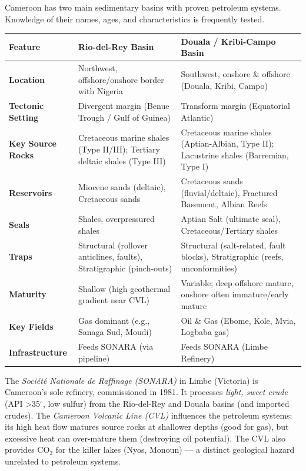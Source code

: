 \documentclass[11pt]{article}
\begin{document}
Cameroon has two main sedimentary basins with proven petroleum systems. Knowledge of their names, ages, and characteristics is frequently tested.

\begin{center}
\begin{tabularx}{\linewidth}{|l|X|X|}\hline
\rowcolor{popblueL}
\textbf{Feature} & \textbf{Rio-del-Rey Basin} & \textbf{Douala / Kribi-Campo Basin} \\ \hline
\textbf{Location} & Northwest, offshore/onshore border with Nigeria & Southwest, onshore \& offshore (Douala, Kribi, Campo) \\ \hline
\textbf{Tectonic Setting} & Divergent margin (Benue Trough / Gulf of Guinea) & Transform margin (Equatorial Atlantic) \\ \hline
\textbf{Key Source Rocks} & Cretaceous marine shales (Type II/III); Tertiary deltaic shales (Type III) & Cretaceous marine shales (Aptian-Albian, Type II); Lacustrine shales (Barremian, Type I) \\ \hline
\textbf{Reservoirs} & Miocene sands (deltaic), Cretaceous sands & Cretaceous sands (fluvial/deltaic), Fractured Basement, Albian Reefs \\ \hline
\textbf{Seals} & Shales, overpressured shales & Aptian Salt (ultimate seal), Cretaceous/Tertiary shales \\ \hline
\textbf{Traps} & Structural (rollover anticlines, faults), Stratigraphic (pinch-outs) & Structural (salt-related, fault blocks), Stratigraphic (reefs, unconformities) \\ \hline
\textbf{Maturity} & Shallow (high geothermal gradient near CVL) & Variable; deep offshore mature, onshore often immature/early mature \\ \hline
\textbf{Key Fields} & Gas dominant (e.g., Sanaga Sud, Moudi) & Oil \& Gas (Ebome, Kole, Mvia, Logbaba gas) \\ \hline
\textbf{Infrastructure} & Feeds SONARA (via pipeline) & Feeds SONARA (Limbe Refinery) \\ \hline
\end{tabularx}
\end{center}

\begin{savaistu}
The \emph{Société Nationale de Raffinage (SONARA)} in Limbe (Victoria) is Cameroon's sole refinery, commissioned in 1981. It processes \emph{light, sweet crude} (API \textgreater 35\ensuremath{{}^{\circ}}, low sulfur) from the Rio-del-Rey and Douala basins (and imported crudes). The \emph{Cameroon Volcanic Line (CVL)} influences the petroleum systems: its high heat flow matures source rocks at shallower depths (good for gas), but excessive heat can over-mature them (destroying oil potential). The CVL also provides CO$_2$ for the killer lakes (Nyos, Monoun) — a distinct geological hazard unrelated to petroleum systems.
\end{savaistu}
\end{document}
